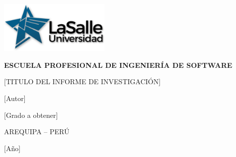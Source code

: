 \begin{titlepage}

    \includegraphics[width=0.4\textwidth]{imagenes/La Salle Logo.png}
    
        \begin{center}
            \vspace*{1cm}
            \textbf{ESCUELA PROFESIONAL DE INGENIERÍA DE SOFTWARE}
            
            \vspace{1.5cm}
            [TITULO DEL  INFORME DE INVESTIGACIÓN]
            
            \vspace{1.5cm}
            [Autor]
            
            \vspace{1.5cm}
            [Grado a obtener]
            
            \vfill
            
            AREQUIPA – PERÚ
            
            \vspace{0.5cm}
            [Año]
        \end{center}

\end{titlepage}